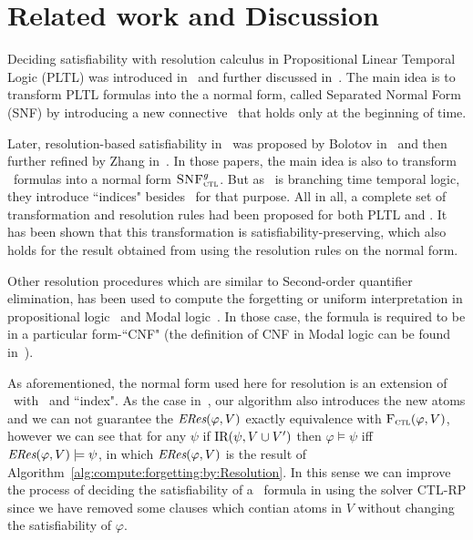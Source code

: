 \documentclass[letterpaper]{article}
\begin{document}
\section{Related work and Discussion}
Deciding satisfiability with resolution calculus in Propositional Linear Temporal Logic (PLTL) was introduced in~\cite{fisher1991resolution} and further discussed in~\cite{fisher1997normal,fisher2001clausal}. The main idea is to transform PLTL formulas into the a normal form, called Separated Normal Form (SNF) by introducing a new connective \start\ that holds only at the beginning of time.

Later,  resolution-based satisfiability in \CTL\ was proposed by Bolotov in~\cite{bolotov2000clausal}  and then further refined by Zhang in~\cite{zhang2009refined,zhang2014resolution}.
In those papers, the main idea is also to transform \CTL\ formulas into a normal form ${\textsc{SNF}_{\textsc{ctl}}^g}$.
But as \CTL\ is branching time temporal logic, they introduce ``indices" besides \start\ for that purpose. All in all, a complete set of transformation and resolution rules had been proposed for both PLTL and \CTL. It has been shown that this transformation is satisfiability-preserving, which also holds for the result obtained from using the resolution rules on the normal form.

Other resolution procedures which are similar to Second-order quantifier elimination, has been used to compute the forgetting or uniform interpretation in propositional logic~\cite{Yisong:2015:arx} and Modal logic~\cite{herzig2008uniform}. In those case, the formula is required to be in a particular form-``CNF" (the definition of CNF in Modal logic can be found in~\cite{herzig2008uniform}).


As aforementioned, the normal form used here for resolution is an extension of \CTL\ with \start\ and ``index". 
As the case in~\cite{zhao2018automated}, our algorithm also introduces the new atoms and we can not guarantee the $\emph{ERes}(\varphi,V)$ exactly equivalence with ${\textsc{F}_{\textsc{ctl}}}(\varphi, V)$, however we can see that for any $\psi$ if $\textrm{IR}(\psi, V \cup V')$ then $\varphi \models \psi$ iff $\emph{ERes}(\varphi,V) \models \psi$, in which $\emph{ERes}(\varphi,V)$ is the result of Algorithm~\ref{alg:compute:forgetting:by:Resolution}. In this sense we can improve the process of deciding the satisfiability of a \CTL\ formula in using the solver CTL-RP since we have removed some clauses which contian atoms in $V$ without changing the satisfiability of $\varphi$.
\end{document}
